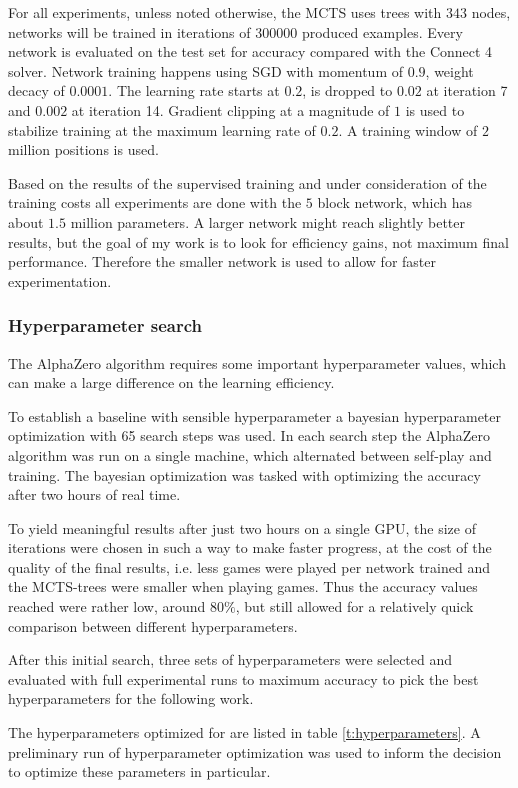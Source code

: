 \documentclass[12pt,onecolumn,oneside,titlepage]{article}
\begin{document}
For all experiments, unless noted otherwise, the MCTS uses trees with $343$ nodes, networks will be trained in iterations of $300000$ produced examples. Every network is evaluated on the test set for accuracy compared with the Connect 4 solver.
Network training happens using SGD with momentum of $0.9$, weight decacy of $0.0001$. The learning rate starts at $0.2$, is dropped to $0.02$ at iteration 7 and $0.002$ at iteration 14. Gradient clipping at a magnitude of $1$ is used to stabilize training at the maximum learning rate of $0.2$.
A training window of $2$ million positions is used.


Based on the results of the supervised training and under consideration of the training costs all experiments are done with the $5$ block network, which has about $1.5$ million parameters. A larger network might reach slightly better results,
but the goal of my work is to look for efficiency gains, not maximum final performance. Therefore the smaller network is used to allow for faster experimentation.

\subsubsection{Hyperparameter search}

The AlphaZero algorithm requires some important hyperparameter values, which can make a large difference on the learning efficiency. 

To establish a baseline with sensible hyperparameter a bayesian hyperparameter optimization with 65 search steps was used.
In each search step the AlphaZero algorithm was run on a single machine, which alternated between self-play and training. The bayesian optimization was tasked with optimizing the accuracy after two hours of real time. 

To yield meaningful results after just two hours on a single GPU,
the size of iterations were chosen in such a way to make faster progress, at the cost of the quality of the final results, i.e. less games were played per network trained and the MCTS-trees were smaller when playing games. Thus the accuracy values reached were rather low, around $80\%$,
but still allowed for a relatively quick comparison between different hyperparameters. 

After this initial search, three sets of hyperparameters were selected and evaluated with full experimental runs to maximum accuracy to pick the best hyperparameters for the following work.

The hyperparameters optimized for are listed in table \ref{t:hyperparameters}. A preliminary run of hyperparameter optimization was used to inform the decision to optimize these parameters in particular.
\end{document}
